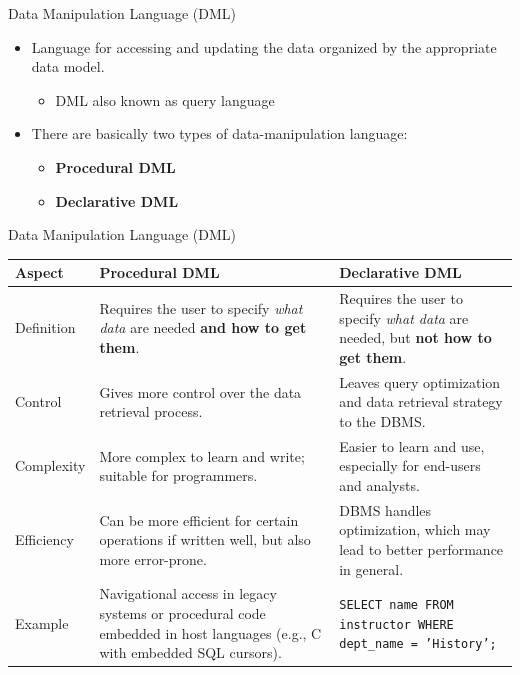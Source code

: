 \documentclass{beamer}
\begin{document}
\begin{frame}{Data Manipulation Language (DML)}
    \begin{itemize}
        \item Language for accessing and updating the data organized by the appropriate data model.
        \begin{itemize}
            \item DML also known as query language
        \end{itemize}
        \item There are basically two types of data-manipulation language:
        \begin{itemize}
            \item \textbf{Procedural DML}
            \item \textbf{Declarative DML}
        \end{itemize}
    \end{itemize}
\end{frame}

\begin{frame}{Data Manipulation Language (DML)}
    \centering
    \scriptsize
    \begin{tabular}{|p{1.5cm}|p{4cm}|p{4cm}|}
    \hline
    \textbf{Aspect} & \textbf{Procedural DML} & \textbf{Declarative DML} \\
    \hline
    Definition & Requires the user to specify \textit{what data} are needed \textbf{and how to get them}. & Requires the user to specify \textit{what data} are needed, but \textbf{not how to get them}. \\
    \hline
    Control & Gives more control over the data retrieval process. & Leaves query optimization and data retrieval strategy to the DBMS. \\
    \hline
    Complexity & More complex to learn and write; suitable for programmers. & Easier to learn and use, especially for end-users and analysts. \\
    \hline
    Efficiency & Can be more efficient for certain operations if written well, but also more error-prone. & DBMS handles optimization, which may lead to better performance in general. \\
    \hline
    Example & Navigational access in legacy systems or procedural code embedded in host languages (e.g., C with embedded SQL cursors). & \texttt{SELECT name FROM instructor WHERE dept\_name = 'History';} \\
    \hline
    \end{tabular}
\end{frame}
\end{document}
